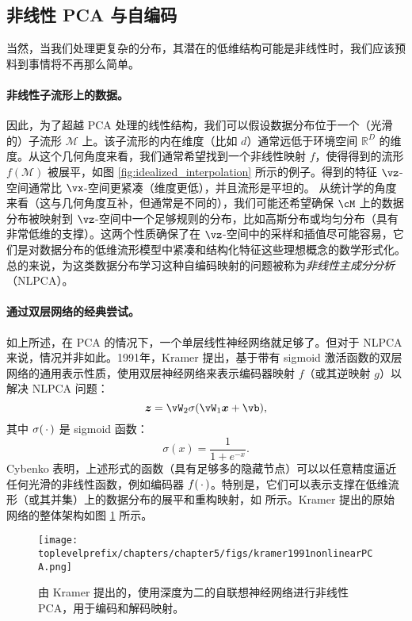 \documentclass[../../book-main_zh.tex]{subfiles}
\begin{document}
\subsection{非线性 PCA 与自编码}\label{sub:nonlinear-pca}\label{sec:NLPCA}
当然，当我们处理更复杂的分布，其潜在的低维结构可能是非线性时，我们应该预料到事情将不再那么简单。

\paragraph{非线性子流形上的数据。} 因此，为了超越 PCA 处理的线性结构，我们可以假设数据分布位于一个（光滑的）子流形 $\mathcal{M}$ 上。该子流形的内在维度（比如 $d$）通常远低于环境空间 $\mathbb{R}^D$ 的维度。从这个几何角度来看，我们通常希望找到一个非线性映射 $f$，使得得到的流形 $f(\mathcal{M})$ 被展平，如图 \ref{fig:idealized_interpolation} 所示的例子。得到的特征 $\vz$-空间通常比 $\vx$-空间更紧凑（维度更低），并且流形是平坦的。
从统计学的角度来看（这与几何角度互补，但通常是不同的），我们可能还希望确保 $\cM$ 上的数据分布被映射到 $\vz$-空间中一个足够规则的分布，比如高斯分布或均匀分布（具有非常低维的支撑）。这两个性质确保了在 $\vz$-空间中的采样和插值尽可能容易，它们是对数据分布的低维流形模型中紧凑和结构化特征这些理想概念的数学形式化。
总的来说，为这类数据分布学习这种自编码映射的问题被称为{\em 非线性主成分分析}（NLPCA）。

\paragraph{通过双层网络的经典尝试。} 如上所述，在 PCA 的情况下，一个单层线性神经网络就足够了。但对于 NLPCA 来说，情况并非如此。1991年，Kramer \cite{Kramer1991NonlinearPC} 提出，基于带有 sigmoid 激活函数的双层网络的通用表示性质，使用双层神经网络来表示编码器映射 $f$（或其逆映射 $g$）以解决 NLPCA 问题：
\begin{equation}
  \z = \vW_2 \sigma(\vW_1\x +\vb),
\end{equation}
其中 $\sigma(\,\cdot\,)$ 是 sigmoid 函数：
\begin{equation}
  \sigma(x) = \frac{1}{1+ e^{-x}}.
\end{equation}
Cybenko \cite{Cybenko1989ApproximationBS} 表明，上述形式的函数（具有足够多的隐藏节点）可以以任意精度逼近任何光滑的非线性函数，例如编码器 $f(\,\cdot\,)$。特别是，它们可以表示支撑在低维流形（或其并集）上的数据分布的展平和重构映射，如  所示。Kramer 提出的原始网络的整体架构如图 \ref{fig:NLPCA} 所示。
\begin{figure}[tb]
  \centering
  \texttt{[image: \\toplevelprefix/chapters/chapter5/figs/kramer1991nonlinearPCA.png]}
  \caption{由 Kramer \cite{Kramer1991NonlinearPC} 提出的，使用深度为二的自联想神经网络进行非线性 PCA，用于编码和解码映射。}
  \label{fig:NLPCA}
\end{figure}
\end{document}
